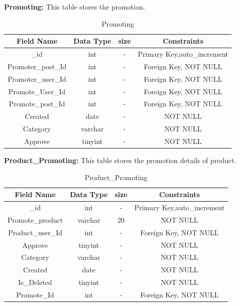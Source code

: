 \pagebreak

\textbf{Promoting: } This table stores the promotion.\nolinebreak
\begin{table}[hp]
\centering
\begin{tabular}{|c|c|c|c|}
\hline
\textbf{Field Name}  & \textbf{Data Type}  & \textbf{size} &\textbf{Constraints}  \\
\hline
\_id &	int & - & Primary Key,auto\_increment \\\hline
Promoter\_post\_Id &	 int & - & Foreign Key, NOT NULL \\\hline
Promoter\_user\_Id &	int & - & Foreign Key, NOT NULL \\\hline
Promote\_User\_Id &	int & - & Foreign Key, NOT NULL \\\hline
Promote\_post\_Id &	int & - & Foreign Key, NOT NULL \\\hline
Created & date &	 - & NOT NULL \\\hline
Category & varchar &	- & NOT NULL \\\hline
Approve & tinyint &	- & NOT NULL \\\hline
 
\end{tabular}
\caption{Promoting}
\end{table}

\textbf{Product\_Promoting:} This table stores the  promotion details of product.\nolinebreak
\begin{table}[hp]
\centering
\begin{tabular}{|c|c|c|c|}
\hline
\textbf{Field Name}  & \textbf{Data Type}  & \textbf{size} &\textbf{Constraints}  \\
\hline
\_id	& int &	- & Primary Key,auto\_increment \\\hline
Promote\_product &	varchar	 & 20 & NOT NULL \\\hline
Product\_user\_Id &	 int &	- & Foreign Key, NOT NULL \\\hline
Approve & tinyint &	- & NOT NULL \\\hline
Category & varchar &	- & NOT NULL \\\hline
Created & date &	 - & NOT NULL \\\hline
Is\_Deleted & tinyint & - & NOT NULL \\\hline
Promote\_Id & int & - & Foreign Key, NOT NULL \\\hline
 
\end{tabular}
\caption{Product\_Promoting}
\end{table}

